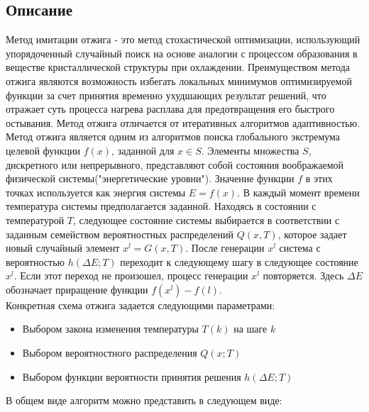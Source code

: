 \documentclass[a4paper]{article}
\begin{document}
		\subsection{Описание}
			Метод имитации отжига - это метод стохастической оптимизации, использующий упорядоченный случайный поиск на основе аналогии с процессом образования в веществе кристаллической структуры при охлаждении. Преимуществом метода отжига являются возможность избегать локальных минимумов оптимизируемой функции за счет принятия временно ухудшающих результат решений, что отражает суть процесса нагрева расплава для предотвращения его быстрого остывания. Метод отжига отличается от итеративных алгоритмов адаптивностью. \\
			Метод отжига является одним из алгоритмов поиска глобального экстремума целевой функции $f(x)$, заданной для $x \in S$. Элементы множества $S$, дискретного или непрерывного, представляют собой состояния воображаемой физической системы("энергетические уровни"). Значение функции $f$ в этих точках используется как энергия системы $E = f(x)$. В каждый момент времени температура системы предполагается заданной. Находясь в состоянии с температурой $T$, следующее состояние системы выбирается в соответствии с заданным семейством вероятностных распределений $Q(x, T)$, которое задает новый случайный элемент $x^l = G(x, T)$. После генерации $x^l$ система с вероятностью $h(\Delta E; T)$ переходит к следующему шагу в следующее состояние $x^l$. Если этот переход не произошел, процесс генерации $x^l$ повторяется. Здесь $\Delta E$ обозначает приращение функции $f(x^l) - f(l)$. \\
			Конкретная схема отжига задается следующими параметрами:
			\begin{itemize}
				\item Выбором закона изменения температуры $T(k)$ на шаге $k$
				\item Выбором вероятностного распределения $Q(x; T)$
				\item Выбором функции вероятности принятия решения $h(\Delta E; T)$
			\end{itemize}
			В общем виде алгоритм можно представить в следующем виде:
\end{document}
